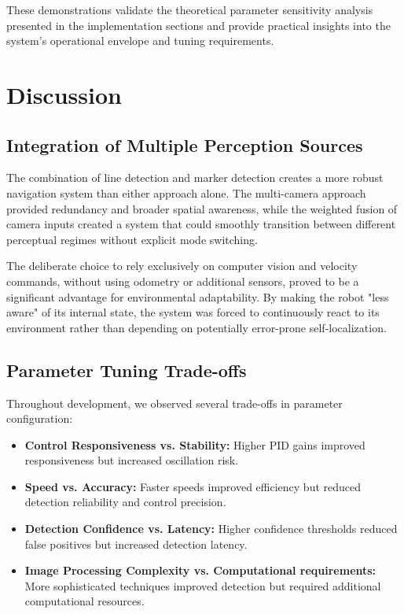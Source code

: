 \documentclass[9pt,technote]{IEEEtran}
\begin{document}
These demonstrations validate the theoretical parameter sensitivity analysis presented in the implementation sections and provide practical insights into the system's operational envelope and tuning requirements.

\section{Discussion}

\subsection{Integration of Multiple Perception Sources}
The combination of line detection and marker detection creates a more robust navigation system than either approach alone. The multi-camera approach provided redundancy and broader spatial awareness, while the weighted fusion of camera inputs created a system that could smoothly transition between different perceptual regimes without explicit mode switching.

The deliberate choice to rely exclusively on computer vision and velocity commands, without using odometry or additional sensors, proved to be a significant advantage for environmental adaptability. By making the robot "less aware" of its internal state, the system was forced to continuously react to its environment rather than depending on potentially error-prone self-localization.

\subsection{Parameter Tuning Trade-offs}
Throughout development, we observed several trade-offs in parameter configuration:

\begin{itemize}
    \item \textbf{Control Responsiveness vs. Stability:} Higher PID gains improved responsiveness but increased oscillation risk.
    \item \textbf{Speed vs. Accuracy:} Faster speeds improved efficiency but reduced detection reliability and control precision.
    \item \textbf{Detection Confidence vs. Latency:} Higher confidence thresholds reduced false positives but increased detection latency.
    \item \textbf{Image Processing Complexity vs. Computational requirements:} More sophisticated techniques improved detection but required additional computational resources.
\end{itemize}
\end{document}
